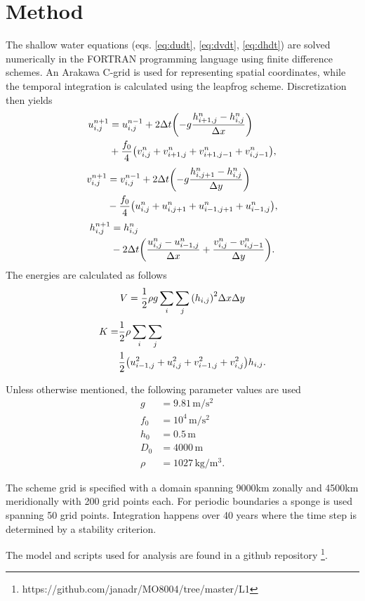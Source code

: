 \section{Method}
\label{sec:method}
The shallow water equations (eqs. \ref{eq:dudt}, \ref{eq:dvdt}, \ref{eq:dhdt}) are solved numerically in the FORTRAN programming language using finite difference schemes. An Arakawa C-grid is used for representing spatial coordinates, while the temporal integration is calculated using the leapfrog scheme. Discretization then yields
	\begin{align}
		u^{n+1}_{i,j} &= u^{n-1}_{i,j} + 2\Delta t \qty(-g\frac{h^n_{i+1,j} - h^n_{i,j}}{\Delta x}) \nonumber \\
		&+ \frac{f_0}{4}\qty(v^n_{i,j} + v^n_{i+1,j} + v^n_{i+1,j-1} + v^n_{i,j-1}),
	\label{eq:u_discrete}
	\end{align}
	\begin{align}
		v^{n+1}_{i,j} &= v^{n-1}_{i,j} + 2\Delta t \qty(-g\frac{h^n_{i,j+1} - h^n_{i,j}}{\Delta y}) \nonumber \\
		&- \frac{f_0}{4}\qty(u^n_{i,j} + u^n_{i,j+1} + u^n_{i-1,j+1} + u^n_{i-1,j}),
	\label{eq:v_discrete}
	\end{align}
	\begin{align}
		h^{n+1}_{i,j} &= h^{n}_{i,j} \nonumber  \\
		&- 2\Delta t \qty(\frac{u^n_{i,j} - u^n_{i-1,j}}{\Delta x} + \frac{v^n_{i,j} - v^n_{i,j-1}}{\Delta y}).
	\label{eq:h_discrete}
	\end{align}
The energies are calculated as follows
	\begin{equation}
		V = \frac{1}{2}\rho g \sum_i \sum_j \qty(h_{i,j})^2 \Delta x \Delta y
	\label{eq:potential_discrete}
	\end{equation}
	\begin{align}
		K = &\frac{1}{2} \rho \sum_i \sum_j \nonumber \\
		&\frac{1}{2} \qty(u^2_{i-1,j} + u^2_{i,j} + v^2_{i-1,j} + v^2_{i,j})h_{i,j}.
	\end{align}

Unless otherwise mentioned, the following parameter values are used
	\begin{align*}
		g &= 9.81\, \text{m} / \text{s}^2 \\
		f_0 &= 10^4\, \text{m} / \text{s}^2 \\
		h_0 &= 0.5\, \text{m} \\
		D_0 &= 4000\, \text{m} \\
		\rho &= 1027\, \text{kg} / \text{m}^3.
	\end{align*}

The scheme grid is specified with a domain spanning 9000km zonally and 4500km meridionally with 200 grid points each. For periodic boundaries a sponge is used spanning 50 grid points. Integration happens over 40 years where the time step is determined by a stability criterion.

The model and scripts used for analysis are found in a github repository \footnote{https://github.com/janadr/MO8004/tree/master/L1}.